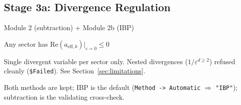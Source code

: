 \documentclass[11pt,a4paper]{article}
\begin{document}
\subsection{Stage 3a: Divergence Regulation}
\begin{description}[style=nextline]
  \item[Source:] Module 2 (subtraction) + Module 2b (IBP)
  \item[When:] Any sector has $\mathrm{Re}(a_{\mathrm{eff},k})|_{\varepsilon=0} \leq 0$
  \item[Limitation:] Single divergent variable per sector only. Nested divergences ($1/\varepsilon^{d\geq 2}$) refused cleanly (\texttt{\$Failed}). See Section~\ref{sec:limitations}.
\end{description}

Both methods are kept; IBP is the default (\texttt{Method\,-> Automatic} $\Rightarrow$ \texttt{"IBP"}); subtraction is the validating cross-check.
\end{document}
